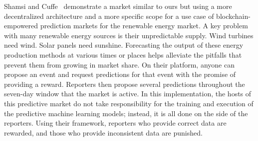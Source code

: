 \documentclass{ledger}
\begin{document}
Shamsi and Cuffe~\cite{windForcasting} demonstrate a market similar to ours but using a more decentralized architecture and a more specific scope for a use case of blockchain-empowered prediction markets for the renewable energy market.
%
A key problem with many renewable energy sources is their unpredictable supply. Wind turbines need wind. Solar panels need sunshine. Forecasting the output of these energy production methods at various times or places helps alleviate the pitfalls that prevent them from growing in market share.
%
On their platform, anyone can propose an event and request predictions for that event with the promise of providing a reward. Reporters then propose several predictions throughout the seven-day window that the market is active. In this implementation, the hosts of this predictive market do not take responsibility for the training and execution of the predictive machine learning models; instead, it is all done on the side of the reporters. Using their framework, reporters who provide correct data are rewarded, and those who provide inconsistent data are punished.
\end{document}
